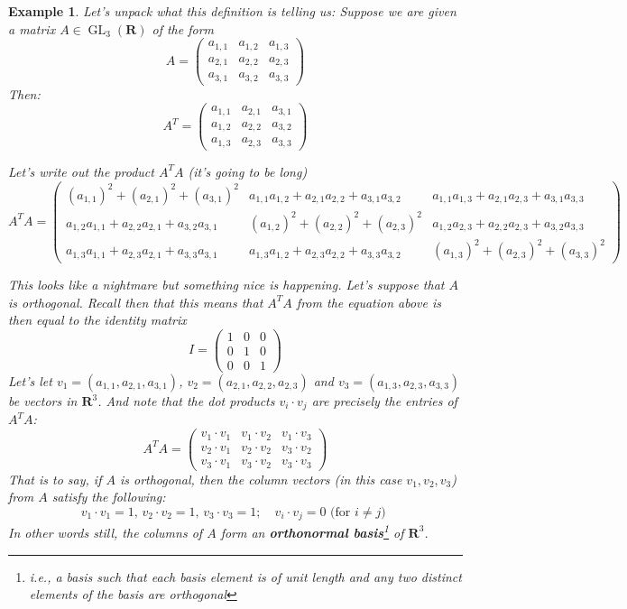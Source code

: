 \documentclass[12pt]{article}
\numberwithin{equation}{subsection}
\theoremstyle{note}
\newtheorem{example}[subsection]{Example}
\newcommand{\GL}{\operatorname{GL}}
\begin{document}
\begin{example}\label{orthogonal}
Let's unpack what this definition is telling us: Suppose we are given a matrix $A\in \GL_3(\mathbf{R})$ of the form \[A=\begin{pmatrix} a_{1,1} & a_{1,2} & a_{1,3} \\ a_{2,1} & a_{2,2} & a_{2,3} \\ a_{3,1} & a_{3,2} & a_{3,3} \end{pmatrix}\]
Then: 
 \[A^T=\begin{pmatrix} a_{1,1} & a_{2,1} & a_{3,1} \\ a_{1,2} & a_{2,2} & a_{3,2} \\ a_{1,3} & a_{2,3} & a_{3,3} \end{pmatrix}\]

Let's write out the product $A^TA$ (it's going to be long)
\begin{equation*} \label{Ex-A-orth}A^TA=
\begin{pmatrix} (a_{1,1})^2+(a_{2,1})^2+(a_{3,1})^2 & 
a_{1,1}a_{1,2} + a_{2,1}a_{2,2} + a_{3,1}a_{3,2} &
 a_{1,1}a_{1,3}+a_{2,1}a_{2,3}+a_{3,1}a_{3,3} \\
 a_{1,2}a_{1,1} +a_{2,2}a_{2,1}+a_{3,2}a_{3,1}& 
  (a_{1,2})^2+(a_{2,2})^2+(a_{2,3})^2 & 
  a_{1,2}a_{2,3}+a_{2,2}a_{2,3}+a_{3,2}a_{3,3} \\ 
  a_{1,3}a_{1,1}+a_{2,3}a_{2,1} + a_{3,3}a_{3,1} &
  a_{1,3}a_{1,2}+a_{2,3}a_{2,2}+a_{3,3}a_{3,2} & 
   (a_{1,3})^2+(a_{2,3})^2+(a_{3,3})^2\end{pmatrix}
\end{equation*}

This looks like a nightmare but something nice is happening. Let's suppose that $A$ is orthogonal. Recall then that this means that $A^TA$ from the equation above is then equal to the identity matrix \[I=\begin{pmatrix} 1 & 0 & 0\\ 0 & 1 & 0 \\ 0 & 0 & 1\end{pmatrix}\]
Let's let $v_1=(a_{1,1}, a_{2,1}, a_{3,1})$, $v_2=(a_{2,1}, a_{2,2}, a_{2,3})$ and $v_3=(a_{1,3}, a_{2,3}, a_{3,3})$ be vectors in $\mathbf{R}^3$. And note that the dot products $v_i\cdot v_j$ are precisely the entries of $A^TA$: \[ A^TA=\begin{pmatrix} v_1\cdot v_1 & v_1\cdot v_2 & v_1\cdot v_3 \\ v_2\cdot v_1 & v_2\cdot v_2 & v_3 \cdot v_2 \\ v_3 \cdot v_1 & v_3\cdot v_2  & v_3\cdot v_3\end{pmatrix}\]  That is to say, if $A$ is orthogonal, then the column vectors (in this case $v_1,v_2,v_3$) from $A$ satisfy the following: \[ v_1\cdot v_1=1,\, v_2\cdot v_2=1, \,v_3\cdot v_3=1; \quad v_i\cdot v_j=0 \text{ (for $i\neq j$) }\]
In other words still, the columns of $A$ form an \textbf{orthonormal basis}\footnote{i.e., a basis such that each basis element is of unit length and any two distinct elements of the basis are orthogonal} of $\mathbf{R}^3$.
\end{example}
\end{document}
